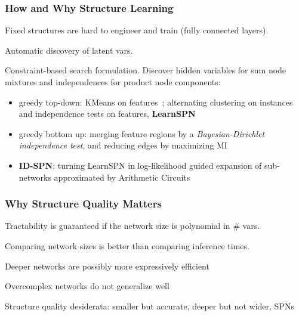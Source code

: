 \documentclass[xcolor={usenames,dvipsnames,svgnames}, compress]{beamer}
\begin{document}
\begin{frame}
  \frametitle{How and Why Structure Learning}
  \footnotesize
  Fixed structures are hard to engineer and train (fully connected layers).\par\bigskip
  
  Automatic discovery of latent vars.\par\bigskip

   Constraint-based search formulation. Discover hidden variables for sum node mixtures and independences
  for product node components:
  \begin{itemize}
    \itemsep 6pt
  \item greedy top-down: KMeans on features~\emph{\parencite{Dennis2012}}; alternating clustering on
    instances and independence tests on features, \textbf{LearnSPN}~\emph{\parencite{Gens2013}}

  \item greedy bottom up: merging feature regions by a \emph{Bayesian-Dirichlet independence test},  and reducing edges by maximizing MI\emph{~\parencite{Peharz2013}}

  

  \item \textbf{ID-SPN}: turning LearnSPN in log-likelihood guided expansion of sub-networks
    approximated by Arithmetic Circuits~\emph{\parencite{Rooshenas2014}}

  \end{itemize}
  \vspace{6pt}

  
\end{frame}

\begin{frame}
  \frametitle{Why Structure Quality Matters}

  \footnotesize
  
  Tractability is guaranteed if the network size is polynomial in \#
  vars.\par\bigskip

  Comparing network sizes is better than comparing inference times.\par\bigskip

  Deeper networks are possibly more expressively efficient~\parencite{Martens2014,Zhao2015}\par\bigskip

  Overcomplex networks do not  generalize well\par\bigskip
  
  Structure quality desiderata: smaller but accurate, deeper but not
  wider, SPNs

  
  
\end{frame}
\end{document}

